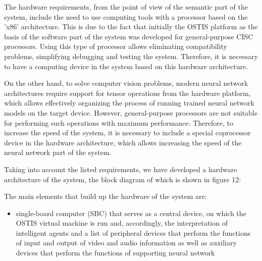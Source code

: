 \documentclass{report}
\begin{document}
\begin{multicols}{2}
\begin{minipage}{.5\textwidth}
\end{minipage}%
\vspace{1cm}

\par The hardware requirements, from the point of view
of the semantic part of the system, include the need
to use computing tools with a processor based on the
’x86’ architecture. This is due to the fact that initially
the OSTIS platform as the basis of the software part
of the system was developed for general-purpose CISC
processors. Using this type of processor allows eliminating compatibility problems, simplifying debugging and
testing the system. Therefore, it is necessary to have a
computing device in the system based on this hardware
architecture.
\par On the other hand, to solve computer vision problems,
modern neural network architectures require support for
tensor operations from the hardware platform, which
allows effectively organizing the process of running
trained neural network models on the target device.
However, general-purpose processors are not suitable for
performing such operations with maximum performance.
Therefore, to increase the speed of the system, it is
necessary to include a special coprocessor device in the
hardware architecture, which allows increasing the speed
of the neural network part of the system.
\par Taking into account the listed requirements, we have
developed a hardware architecture of the system, the
block diagram of which is shown in figure 12:
\par The main elements that build up the hardware of the
system are:
\begin{itemize}
    \item 
 single-board computer (SBC) that serves as a central device, on which the OSTIS virtual machine is
run and, accordingly, the interpretation of intelligent
agents and a list of peripheral devices that perform
the functions of input and output of video and
audio information as well as auxiliary devices that
perform the functions of supporting neural network
\end{itemize}



\end{multicols}
\end{document}
